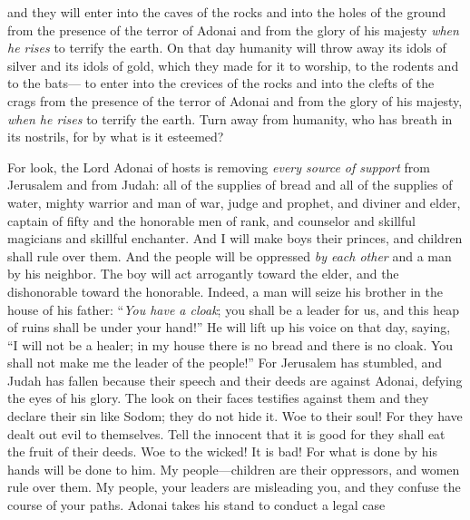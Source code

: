 \begin{biblechapter}
\verse and they will enter into the caves of the rocks 
and into the holes of the ground 
from the presence of the terror of Adonai 
and from the glory of his majesty 
\textit{when he rises} to terrify the earth.
\verse On that day humanity will throw away its idols of silver 
and its idols of gold, 
which they made for it to worship, 
to the rodents and to the bats—
\verse to enter into the crevices of the rocks 
and into the clefts of the crags 
from the presence of the terror of Adonai 
and from the glory of his majesty, 
\textit{when he rises} to terrify the earth.
\verse Turn away from humanity, 
who has breath in its nostrils, 
for by what is it esteemed?
\end{biblechapter}

\begin{biblechapter} %
 For look, the Lord Adonai of hosts is removing \textit{every source of support} 
from Jerusalem and from Judah: 
all of the supplies of bread 
and all of the supplies of water,
\verse mighty warrior and man of war, 
judge and prophet, 
and diviner and elder,
\verse captain of fifty and the honorable men of rank, 
and counselor and skillful magicians and skillful enchanter.
\verse And I will make boys their princes, 
and children shall rule over them.
\verse And the people will be oppressed \textit{by each other} 
and a man by his neighbor. 
The boy will act arrogantly toward the elder, 
and the dishonorable toward the honorable.
\verse Indeed, a man will seize his brother 
in the house of his father: 
“\textit{You have a cloak}; 
you shall be a leader for us, 
and this heap of ruins shall be under your hand!”
\verse He will lift up his voice on that day, saying, 
“I will not be a healer; 
in my house there is no bread 
and there is no cloak. 
You shall not make me the leader of the people!”
\verse For Jerusalem has stumbled, 
and Judah has fallen 
because their speech and their deeds are against Adonai, 
defying the eyes of his glory.
\verse The look on their faces testifies against them 
and they declare their sin like Sodom; 
they do not hide it. 
Woe to their soul! 
For they have dealt out evil to themselves.
\verse Tell the innocent that it is good 
for they shall eat the fruit of their deeds.
\verse Woe to the wicked! It is bad! 
For what is done by his hands will be done to him.
\verse My people—children are their oppressors, 
and women rule over them. 
My people, your leaders are misleading you, 
and they confuse the course of your paths.
\verse Adonai takes his stand to conduct a legal case 

\end{biblechapter}
